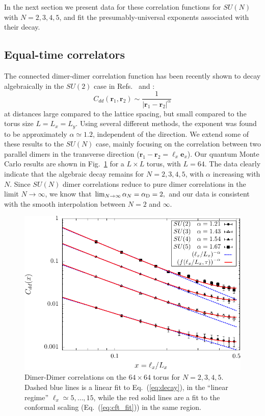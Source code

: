 \documentclass[11pt]{iopart}
\begin{document}
In the next section we present data for these correlation functions for $SU(N)$ with $N=2,3,4,5$,  and fit the presumably-universal exponents associated with their decay.

\subsection{Equal-time correlators}
\label{sec:dimerdimer}


The connected dimer-dimer correlation function has been recently shown to decay algebraically in the $SU(2)$ case in Refs.~\cite{RVB1} and \cite{RVB2}:
\begin{equation}\label{eq:decay}
 C_{dd}(\mathbf{r}_1,\mathbf{r}_2)\sim \frac{1}{\left|\mathbf{r}_1-\mathbf{r}_2\right|^\alpha}
\end{equation}
at distances large compared to the lattice spacing, but small compared to the torus size $L=L_x=L_y$. Using several different methods, the exponent was found to be approximately $\alpha \simeq 1.2$, independent of the direction.
We extend some of these results to the $SU(N)$ case, mainly focusing on the correlation between two parallel dimers in the transverse direction ($\mathbf{r}_1-\mathbf{r}_2=\ell_x \mathbf{e}_x$). 
Our quantum Monte Carlo results are shown in Fig.~\ref{fig:corr_su2_dimers} for a $L\times L$ torus, with $L=64$. The data clearly indicate that the algebraic decay remains for $N=2,3,4,5$, with $\alpha$ increasing with $N$. 
Since $SU(N)$ dimer correlations reduce to pure dimer correlations in the limit $N\to\infty$, we know that
$
 \lim_{N \to \infty} \alpha_N=\alpha_{\rm D}=2,
$
 and our data is consistent with the smooth interpolation between $N=2$ and $\infty$. \begin{figure}[ht]
 \begin{center}
  \includegraphics[scale=0.8]{./figures/corr_su2.pdf}
 \end{center}
\caption{Dimer-Dimer correlations on the $64 \times 64$ torus for $N=2,3,4,5$. Dashed blue lines is a linear fit to Eq.~(\ref{eq:decay}), in the ``linear regime'' $\ell_x \simeq 5,\ldots,15$, while the red solid lines are a fit to the conformal scaling (Eq.~(\ref{eq:cft_fit})) in the same region.}
\label{fig:corr_su2_dimers}
\end{figure}
\end{document}
